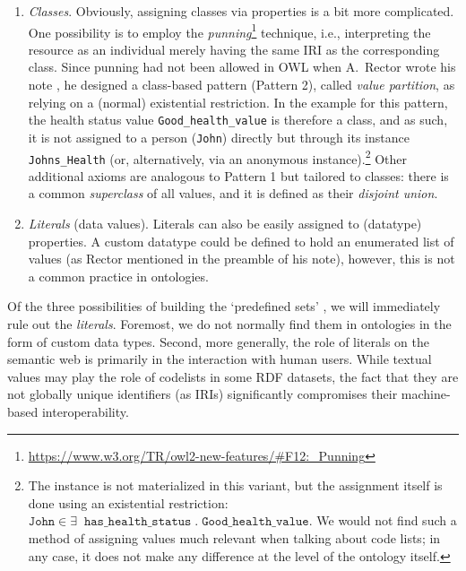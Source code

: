 \begin{enumerate}
    \item \emph{Classes}.
    Obviously, assigning classes via properties is a bit more complicated. 
    One possibility is to employ the \emph{punning}\footnote{\url{https://www.w3.org/TR/owl2-new-features/\#F12:\_Punning}} technique, i.e., interpreting the resource as an  individual merely having the same IRI as the corresponding class. 
    Since punning had not been allowed in OWL when A.~Rector wrote his note \cite{alanrector}, he designed a class-based pattern (Pattern 2), called \emph{value partition}, as relying on a (normal) existential restriction. In the example for this pattern, the health status value \texttt{Good\_health\_value} is therefore a class, and as such, it is not assigned to a person (\texttt{John}) directly but through its instance \texttt{Johns\_Health} (or, alternatively, via an anonymous instance).\footnote{The instance is not materialized in this variant, but the assignment itself is done using an existential restriction: $\texttt{John} \in \exists \; \; \texttt{has\_health\_status} \; . \; \texttt{Good\_health\_value}$. We would not find such a method of assigning values much relevant when talking about code lists; in any case, it does not make any difference at the level of the ontology itself.}
    Other additional axioms are analogous to Pattern 1 but tailored to classes: there is a common \emph{superclass} of all values, and it is defined as their \emph{disjoint union}.
    
    \item \emph{Literals} (data values).
    Literals can also be easily assigned to (datatype) properties.
    A custom datatype could be defined to hold an enumerated list of values (as Rector mentioned in the preamble of his note), however, this is not a common practice in ontologies.
\end{enumerate}

Of the three possibilities of building the `predefined sets' \cite{guide_code_list}, we will immediately rule out the \emph{literals}.
Foremost, we do not normally find them in ontologies in the form of custom data types.
Second, more generally, the role of literals on the semantic web is primarily in the interaction with human users. 
While textual values may play the role of codelists in some RDF datasets, the fact that they are not globally unique identifiers (as IRIs) significantly compromises their machine-based interoperability.

